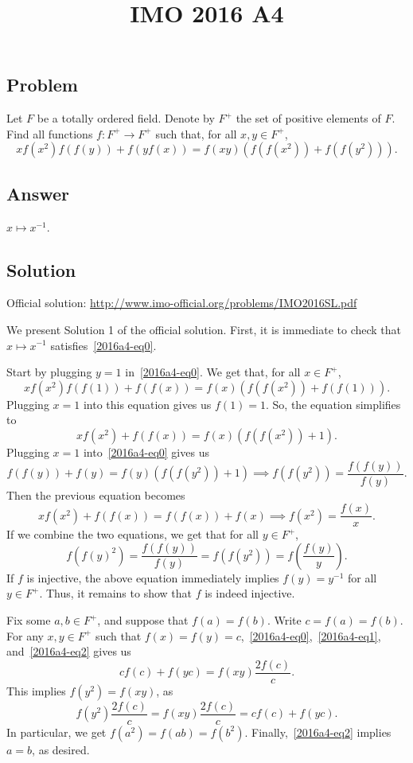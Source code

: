 \documentclass{article}
\title{IMO 2016 A4}
\author{}
\date{}
\begin{document}
\maketitle



\subsection*{Problem}

Let $F$ be a totally ordered field.
Denote by $F^+$ the set of positive elements of $F$.
Find all functions $f : F^+ \to F^+$ such that, for all $x, y \in F^+$,
\[ x f(x^2) f(f(y)) + f(y f(x)) = f(xy) (f(f(x^2)) + f(f(y^2))). \tag{*}\label{2016a4-eq0} \]



\subsection*{Answer}

$x \mapsto x^{-1}$.



\subsection*{Solution}

Official solution: \url{http://www.imo-official.org/problems/IMO2016SL.pdf}

We present Solution 1 of the official solution.
First, it is immediate to check that $x \mapsto x^{-1}$ satisfies~\eqref{2016a4-eq0}.

Start by plugging $y = 1$ in~\eqref{2016a4-eq0}.
We get that, for all $x \in F^+$,
\[ x f(x^2) f(f(1)) + f(f(x)) = f(x) (f(f(x^2)) + f(f(1))). \]
Plugging $x = 1$ into this equation gives us $f(1) = 1$.
So, the equation simplifies to
\[ x f(x^2) + f(f(x)) = f(x) (f(f(x^2)) + 1). \]
Plugging $x = 1$ into~\eqref{2016a4-eq0} gives us
\[ f(f(y)) + f(y) = f(y) (f(f(y^2)) + 1) \implies f(f(y^2)) = \frac{f(f(y))}{f(y)}. \tag{1}\label{2016a4-eq1} \]
Then the previous equation becomes
\[ x f(x^2) + f(f(x)) = f(f(x)) + f(x) \implies f(x^2) = \frac{f(x)}{x}. \tag{2}\label{2016a4-eq2} \]
If we combine the two equations, we get that for all $y \in F^+$,
\[ f(f(y)^2) = \frac{f(f(y))}{f(y)} = f(f(y^2)) = f\left(\frac{f(y)}{y}\right). \]
If $f$ is injective, the above equation immediately implies $f(y) = y^{-1}$ for all $y \in F^+$.
Thus, it remains to show that $f$ is indeed injective.

Fix some $a, b \in F^+$, and suppose that $f(a) = f(b)$.
Write $c = f(a) = f(b)$.
For any $x, y \in F^+$ such that $f(x) = f(y) = c$,~\eqref{2016a4-eq0},~\eqref{2016a4-eq1}, and~\eqref{2016a4-eq2} gives us
\[ c f(c) + f(yc) = f(xy) \frac{2 f(c)}{c}. \]
This implies $f(y^2) = f(xy)$, as
\[ f(y^2) \frac{2 f(c)}{c} = f(xy) \frac{2 f(c)}{c} = c f(c) + f(yc). \]
In particular, we get $f(a^2) = f(ab) = f(b^2)$.
Finally,~\eqref{2016a4-eq2} implies $a = b$, as desired.
\end{document}

